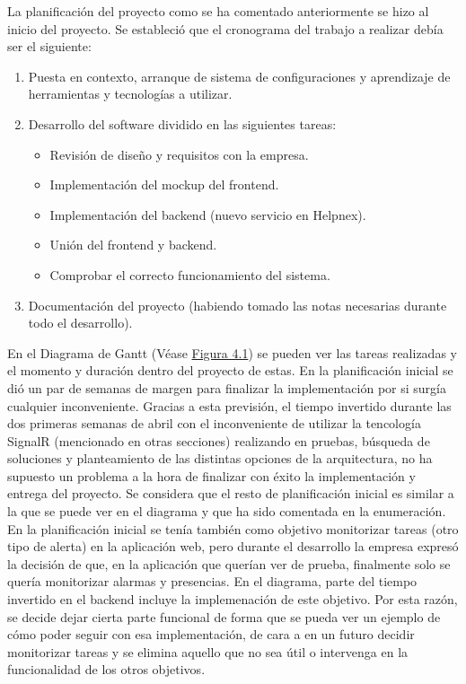 La planificación del proyecto como se ha comentado anteriormente se hizo al inicio del proyecto. Se estableció que el cronograma del trabajo a realizar debía ser el siguiente:
\begin{enumerate}
    \item Puesta en contexto, arranque de sistema de configuraciones y aprendizaje de herramientas y tecnologías a utilizar.
    \item Desarrollo del software dividido en las siguientes tareas:
    \begin{itemize}
        \item Revisión de diseño y requisitos con la empresa.
        \item Implementación del mockup del frontend.
        \item Implementación del backend (nuevo servicio en Helpnex).
        \item Unión del frontend y backend.
        \item Comprobar el correcto funcionamiento del sistema.
    \end{itemize}
    \item Documentación del proyecto (habiendo tomado las notas necesarias durante todo el desarrollo).
\end{enumerate}

En el Diagrama de Gantt (Véase \hyperref[fig:gantt]{Figura 4.1}) se pueden ver las tareas realizadas y el momento y duración dentro del proyecto de estas. En la planificación inicial se dió un par de semanas de margen para finalizar la implementación por si surgía cualquier inconveniente. Gracias a esta previsión, el tiempo invertido durante las dos primeras semanas de abril con el inconveniente de utilizar la tencología SignalR (mencionado en otras secciones) realizando en pruebas, búsqueda de soluciones y planteamiento de las distintas opciones de la arquitectura, no ha supuesto un problema a la hora de finalizar con éxito la implementación y entrega del proyecto. Se considera que el resto de planificación inicial es similar a la que se puede ver en el diagrama y que ha sido comentada en la enumeración. \\

En la planificación inicial se tenía también como objetivo monitorizar tareas (otro tipo de alerta) en la aplicación web, pero durante el desarrollo la empresa expresó la decisión de que, en la aplicación que querían ver de prueba, finalmente solo se quería monitorizar alarmas y presencias. En el diagrama, parte del tiempo invertido en el backend incluye la implemenación de este objetivo. Por esta razón, se decide dejar cierta parte funcional de forma que se pueda ver un ejemplo de cómo poder seguir con esa implementación, de cara a en un futuro decidir monitorizar tareas y se elimina aquello que no sea útil o intervenga en la funcionalidad de los otros objetivos.

